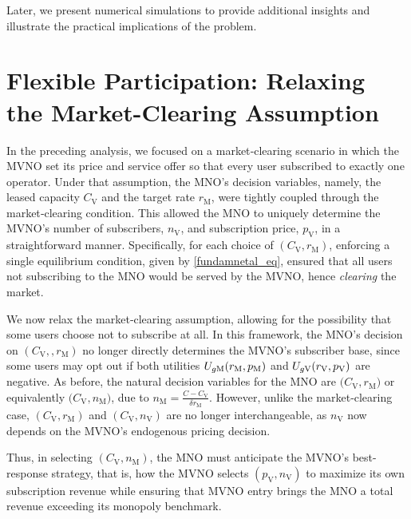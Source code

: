 \documentclass[12pt, draftclsnofoot, onecolumn]{IEEEtran}
\begin{document}
		
		
		Later, we present numerical simulations to provide additional insights and illustrate the practical implications of the problem.
			\vspace{-.5cm}
		\section{Flexible Participation: Relaxing the Market-Clearing Assumption}
		In the preceding analysis, we focused on a market‐clearing scenario in which the MVNO set its price and service offer so that every user subscribed to exactly one operator. Under that assumption, the MNO's decision variables, namely, the leased capacity \(C_{\mathrm{V}}\) and the target rate \(r_{\mathrm{M}}\), were tightly coupled through the market‐clearing condition. This allowed the MNO to uniquely determine the MVNO’s number of subscribers, \(n_{\mathrm{V}}\), and subscription price, \(p_{\mathrm{V}}\), in a straightforward manner. Specifically, for each choice of \((C_{\mathrm{V}},r_{\mathrm{M}})\), enforcing a single equilibrium condition, given by \eqref{fundamnetal_eq}, ensured that all users not subscribing to the MNO would be served by the MVNO, hence \emph{clearing} the market.	
		
		We now relax the market‐clearing assumption, allowing for the possibility that some users choose not to subscribe at all. In this framework, the MNO’s decision on \((C_{\mathrm{V}}, ,r_{\mathrm{M}})\) no longer directly determines the MVNO’s subscriber base, since some users may opt out if both utilities \(U_{g{\rm M}}(r_{\mathrm{M}},p_{\mathrm{M}})\) and \(U_{g{\rm V}}(r_{\mathrm{V}},p_{\mathrm{V}})\) are negative. As before, the natural decision variables for the MNO are \(\bigl(C_{\mathrm{V}}, r_{\mathrm{M}}\bigr)\) or equivalently \(\bigl(C_{\mathrm{V}}, n_{\mathrm{M}}\bigr)\), due to \(n_{\mathrm{M}}=\frac{C-C_{\mathrm{V}}}{\delta r_{\mathrm{M}}}\). However, unlike the market‐clearing case, \( (C_{\mathrm{V}}, r_{\mathrm{M}}) \) and \( (C_{\mathrm{V}}, n_{\mathrm{V}}) \) are no longer interchangeable, as \( n_{\mathrm{V}} \) now depends on the MVNO's endogenous pricing decision. 
		
		Thus, in selecting \( (C_{\mathrm{V}}, n_{\mathrm{M}}) \), the MNO must anticipate the MVNO’s best-response strategy, that is, how the MVNO selects \( (p_{\mathrm{V}}, n_{\mathrm{V}}) \) to maximize its own subscription revenue while ensuring that MVNO entry brings the MNO a total revenue exceeding its monopoly benchmark.
			\vspace{-.5cm}
		
\end{document}
